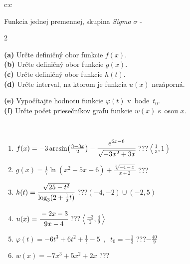 \documentclass[10pt]{report}
\begin{document}
\begin{tabular}{c:c}
\begin{minipage}[c][104.5mm][t]{0.5\linewidth}
\begin{center}
\vspace{7mm}
{\huge Funkcia jednej premennej, skupina \textit{Sigma $\sigma$} -}\\[5mm]
\begin{minipage}{0.95\linewidth}
\begin{center}
{\small \begin{multicols}{2} \raggedright
\textbf{(a)} Určte definičný obor funkcie \(f(x)\). \\[1mm]
\textbf{(b)} Určte definičný obor funkcie \(g(x)\). \\[1mm]
\textbf{(c)} Určte definičný obor funkcie \(h(t)\). \\[1mm]
\textbf{(d)} Určte interval, na ktorom je funkcia \(u(x)\) nezáporná. \par \columnbreak
\textbf{(e)} Vypočítajte hodnotu funkcie \(\varphi(t)\) v~bode~\(t_0\). \\[1mm]
\textbf{(f)} Určte počet priesečníkov grafu funkcie \(w(x)\) s~osou \(x\). \\[1mm]
\end{multicols}
}
\end{center}
\end{minipage}
\\[4mm]
\begin{minipage}{0.79\linewidth}
\begin{center}
\begin{varwidth}{\linewidth}
\begin{enumerate}
\small
\item $f(x) = -3\arcsin\!\left( \frac{3-3x}{2} \right) - \cfrac{e^{6x-6}}{\sqrt{-3x^2+3x}}$\quad \dotfill\; ???\;\dotfill \quad $\left\langle\frac{1}{3} , 1\right)$
\item $g(x) = \frac{1}{7} \ln{\!(x^2-5x-6)}+\frac{\sqrt[3]{-4-x}}{x+2}$\quad \dotfill\; ???\;\dotfill {}
\item $h(t) = \cfrac{\sqrt{25-t^2}}{\log_3(2+\frac{1}{2}t)}$\quad \dotfill\; ???\;\dotfill \quad $\left(-4 , -2\right)\cup\left(-2 , 5\right)$
\item $u(x) = \cfrac{-2x-3}{9x-4}$\quad \dotfill\; ???\;\dotfill \quad $\left\langle\frac{-3}{2} , \frac{4}{9}\right\rangle$
\item $\varphi(t) = -6t^3+6t^2+\frac{1}{t}-5 \enspace , \enspace t_0=-\frac{1}{3}$\quad \dotfill\; ???\;\dotfill \quad $-\frac{40}{9}$
\item $w(x) = -7x^3+5x^2+2x$\quad \dotfill\; ???\;\dotfill {}

\end{enumerate}
\end{varwidth}
\end{center}
\end{minipage}
\end{center}
\end{minipage}
\end{tabular}
\end{document}
